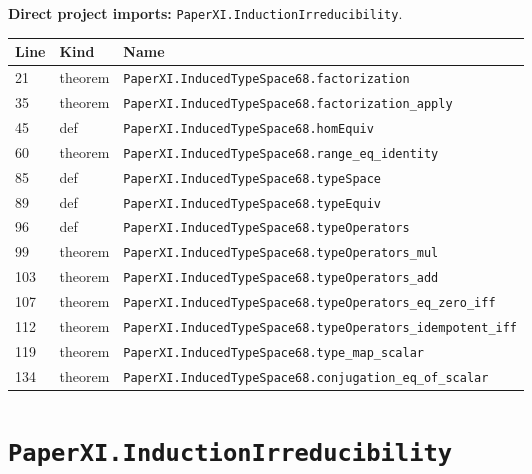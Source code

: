 \documentclass[10pt,oneside]{book}
\begin{document}
\textbf{Direct project imports:} \nolinkurl{PaperXI.InductionIrreducibility}.

\begin{longtable}{@{}p{}p{}p{}@{}}\toprule Line&Kind&Name\\\midrule\endhead

21&theorem&\nolinkurl{PaperXI.InducedTypeSpace68.factorization}\\

35&theorem&\nolinkurl{PaperXI.InducedTypeSpace68.factorization_apply}\\

45&def&\nolinkurl{PaperXI.InducedTypeSpace68.homEquiv}\\

60&theorem&\nolinkurl{PaperXI.InducedTypeSpace68.range_eq_identity}\\

85&def&\nolinkurl{PaperXI.InducedTypeSpace68.typeSpace}\\

89&def&\nolinkurl{PaperXI.InducedTypeSpace68.typeEquiv}\\

96&def&\nolinkurl{PaperXI.InducedTypeSpace68.typeOperators}\\

99&theorem&\nolinkurl{PaperXI.InducedTypeSpace68.typeOperators_mul}\\

103&theorem&\nolinkurl{PaperXI.InducedTypeSpace68.typeOperators_add}\\

107&theorem&\nolinkurl{PaperXI.InducedTypeSpace68.typeOperators_eq_zero_iff}\\

112&theorem&\nolinkurl{PaperXI.InducedTypeSpace68.typeOperators_idempotent_iff}\\

119&theorem&\nolinkurl{PaperXI.InducedTypeSpace68.type_map_scalar}\\

134&theorem&\nolinkurl{PaperXI.InducedTypeSpace68.conjugation_eq_of_scalar}\\

\bottomrule\end{longtable}

\section{\texorpdfstring{\nolinkurl{PaperXI.InductionIrreducibility}}{PaperXI.InductionIrreducibility}}\label{module:PaperXI.InductionIrreducibility}
\end{document}
